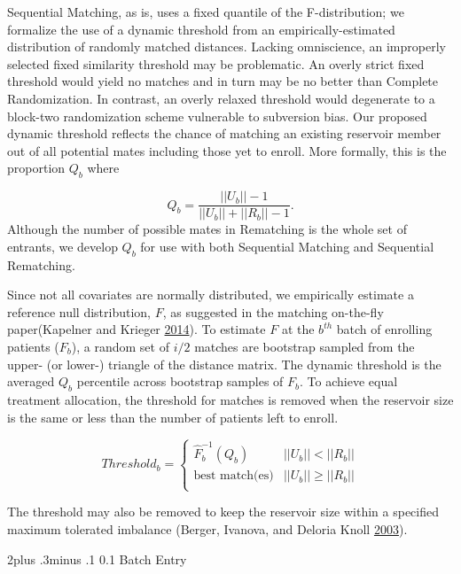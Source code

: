 \documentclass[12pt,oneside]{book}
\makeatletter
\newlength{\li}\setlength{\li}{14.48pt}
\newlength{\di}\setlength{\di}{-3.5mm}
\renewcommand\section{ \@startsection {section}{1}{\z@}%
    {2\@bls  plus .3\@bls minus .1\@bls}%
    {0.1\@bls}%
    {\centering\normalfont}}
\theoremstyle{definition}
\theoremstyle{definition}
\theoremstyle{definition}
\theoremstyle{remark}
\makeatother
\begin{document}
Sequential Matching, as is, uses a fixed quantile of the F-distribution;
we formalize the use of a dynamic threshold from an
empirically-estimated distribution of randomly matched distances.
Lacking omniscience, an improperly selected fixed similarity threshold
may be problematic. An overly strict fixed threshold would yield no
matches and in turn may be no better than Complete Randomization. In
contrast, an overly relaxed threshold would degenerate to a block-two
randomization scheme vulnerable to subversion bias. Our proposed dynamic
threshold reflects the chance of matching an existing reservoir member
out of all potential mates including those yet to enroll. More formally,
this is the proportion \(Q_b\) where

\[
Q_b = \frac{||  U_b || - 1}{ ||U_b|| + ||R_b|| - 1}.
\] Although the number of possible mates in Rematching is the whole set
of entrants, we develop \(Q_b\) for use with both Sequential Matching
and Sequential Rematching.

Since not all covariates are normally distributed, we empirically
estimate a reference null distribution, \(F\), as suggested in the
matching on-the-fly paper(Kapelner and Krieger
\protect\hyperlink{ref-Kapelner:2014cu}{2014}). To estimate \(F\) at the
\(b^{th}\) batch of enrolling patients (\(F_b\)), a random set of
\(i/2\) matches are bootstrap sampled from the upper- (or lower-)
triangle of the distance matrix. The dynamic threshold is the averaged
\(Q_b\) percentile across bootstrap samples of \(F_b\). To achieve equal
treatment allocation, the threshold for matches is removed when the
reservoir size is the same or less than the number of patients left to
enroll.

\[
Threshold_b = \begin{cases} \hat{F}_b^{-1} (Q_b) &  || U_b || < || R_b || \\
                    \text{best match(es)}      &  || U_b || \ge || R_b || \\
      \end{cases}
\]

The threshold may also be removed to keep the reservoir size within a
specified maximum tolerated imbalance (Berger, Ivanova, and Deloria
Knoll \protect\hyperlink{ref-Berger:2003im}{2003}).

\hypertarget{batch-entry}{%
\section{Batch Entry}\label{batch-entry}}
\end{document}
